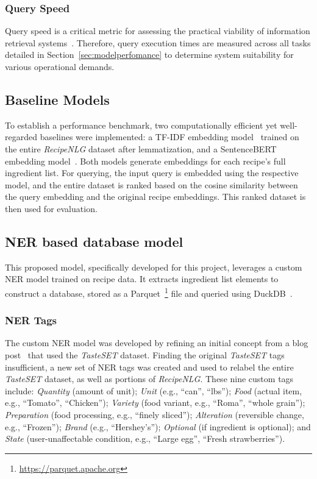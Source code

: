 \documentclass[11pt]{article}
\begin{document}
\subsubsection{Query Speed}
Query speed is a critical metric for assessing the practical viability of
information retrieval systems~\cite{manning2009introduction}.
Therefore, query execution times are measured across all tasks detailed in
Section~\ref{sec:modelperfomance} to determine system suitability for various
operational demands.

\subsection{Baseline Models}
To establish a performance benchmark, two computationally efficient yet
well-regarded baselines were implemented: a TF-IDF embedding model~\cite{tfidf}
trained on the entire \emph{RecipeNLG} dataset after lemmatization, and a
SentenceBERT embedding model~\cite{sentence-bert}.
Both models generate embeddings for each recipe's full ingredient list.
For querying, the input query is embedded using the respective model, and the
entire dataset is ranked based on the cosine similarity between the query
embedding and the original recipe embeddings.
This ranked dataset is then used for evaluation.

\subsection{NER based database model}
This proposed model, specifically developed for this project, leverages a custom
NER model trained on recipe data.
It extracts ingredient list elements to construct a database, stored as a
Parquet~\footnote{\url{https://parquet.apache.org}} file and queried using
DuckDB~\cite{duckdb}.

\subsubsection{NER Tags}\label{sec:ner_tags}
The custom NER model was developed by refining an initial concept from a blog
post~\cite{ingNerwb} that used the \emph{TasteSET} dataset.
Finding the original \emph{TasteSET} tags insufficient, a new set of NER tags
was created and used to relabel the entire \emph{TasteSET} dataset, as well as
portions of \emph{RecipeNLG}.
These nine custom tags include: \emph{Quantity} (amount of unit); \emph{Unit}
(e.g., ``can'', ``lbs''); \emph{Food} (actual item, e.g., ``Tomato'',
``Chicken''); \emph{Variety} (food variant, e.g., ``Roma'', ``whole grain'');
\emph{Preparation} (food processing, e.g., ``finely sliced''); \emph{Alteration}
(reversible change, e.g., ``Frozen''); \emph{Brand} (e.g., ``Hershey's'');
\emph{Optional} (if ingredient is optional); and \emph{State} (user-unaffectable
condition, e.g., ``Large egg'', ``Fresh strawberries'').
\end{document}
